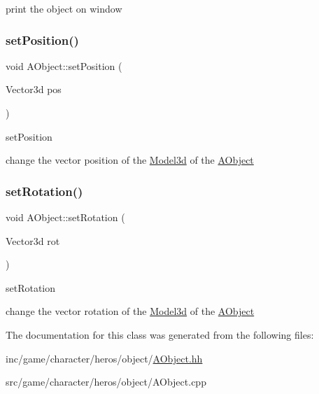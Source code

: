 print the object on window \mbox{\label{classAObject_ab4a2dc3dad1a54ff80d59c42a51479fb}} 
\subsubsection{\texorpdfstring{set\+Position()}{setPosition()}}
{\footnotesize\ttfamily void A\+Object\+::set\+Position (\begin{DoxyParamCaption}\item[{Vector3d}]{pos }\end{DoxyParamCaption})}



set\+Position 

change the vector position of the \hyperlink{classModel3d}{Model3d} of the \hyperlink{classAObject}{A\+Object} \mbox{\label{classAObject_a38ba628dcec6be910ce9d3c9f0de0de7}} 
\subsubsection{\texorpdfstring{set\+Rotation()}{setRotation()}}
{\footnotesize\ttfamily void A\+Object\+::set\+Rotation (\begin{DoxyParamCaption}\item[{Vector3d}]{rot }\end{DoxyParamCaption})}



set\+Rotation 

change the vector rotation of the \hyperlink{classModel3d}{Model3d} of the \hyperlink{classAObject}{A\+Object} 

The documentation for this class was generated from the following files\+:\begin{DoxyCompactItemize}
\item 
inc/game/character/heros/object/\hyperlink{AObject_8hh}{A\+Object.\+hh}\item 
src/game/character/heros/object/A\+Object.\+cpp\end{DoxyCompactItemize}
